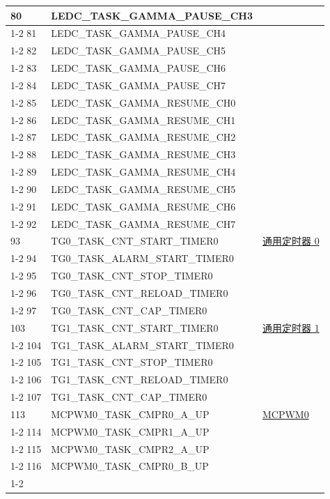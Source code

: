 \documentclass[main\_\_CN.tex]{subfiles}
\begin{document}
\begin{longtable}{ | l | l | l | }
80  & LEDC\_TASK\_GAMMA\_PAUSE\_CH3 & \\ \cline{1-2}
81  & LEDC\_TASK\_GAMMA\_PAUSE\_CH4 & \\ \cline{1-2}
82  & LEDC\_TASK\_GAMMA\_PAUSE\_CH5 & \\ \cline{1-2}
83  & LEDC\_TASK\_GAMMA\_PAUSE\_CH6 & \\ \cline{1-2}
84  & LEDC\_TASK\_GAMMA\_PAUSE\_CH7 & \\ \cline{1-2}
85  & LEDC\_TASK\_GAMMA\_RESUME\_CH0& \\ \cline{1-2}
86  & LEDC\_TASK\_GAMMA\_RESUME\_CH1& \\ \cline{1-2}
87  & LEDC\_TASK\_GAMMA\_RESUME\_CH2& \\ \cline{1-2}
88  & LEDC\_TASK\_GAMMA\_RESUME\_CH3& \\ \cline{1-2}
89  & LEDC\_TASK\_GAMMA\_RESUME\_CH4& \\ \cline{1-2}
90  & LEDC\_TASK\_GAMMA\_RESUME\_CH5& \\ \cline{1-2}
91  & LEDC\_TASK\_GAMMA\_RESUME\_CH6& \\ \cline{1-2}
92  & LEDC\_TASK\_GAMMA\_RESUME\_CH7& \\ \hline
93  & TG0\_TASK\_CNT\_START\_TIMER0     & \hyperref[mod:timg]{通用定时器 0}\\ \cline{1-2}
94  & TG0\_TASK\_ALARM\_START\_TIMER0   & \\ \cline{1-2}
95  & TG0\_TASK\_CNT\_STOP\_TIMER0      & \\ \cline{1-2}
96  & TG0\_TASK\_CNT\_RELOAD\_TIMER0    & \\ \cline{1-2}
97  & TG0\_TASK\_CNT\_CAP\_TIMER0       & \\ \hline
103 & TG1\_TASK\_CNT\_START\_TIMER0     & \hyperref[mod:timg]{通用定时器 1}\\ \cline{1-2}
104 & TG1\_TASK\_ALARM\_START\_TIMER0   & \\ \cline{1-2}
105 & TG1\_TASK\_CNT\_STOP\_TIMER0      & \\ \cline{1-2}
106 & TG1\_TASK\_CNT\_RELOAD\_TIMER0    & \\ \cline{1-2}
107 & TG1\_TASK\_CNT\_CAP\_TIMER0       & \\ \hline
113 & MCPWM0\_TASK\_CMPR0\_A\_UP& \hyperref[mod:mcpwm]{MCPWM0}\\ \cline{1-2}
114 & MCPWM0\_TASK\_CMPR1\_A\_UP& \\ \cline{1-2}
115 & MCPWM0\_TASK\_CMPR2\_A\_UP& \\ \cline{1-2}
116 & MCPWM0\_TASK\_CMPR0\_B\_UP& \\ \cline{1-2}

\end{longtable}
\end{document}
